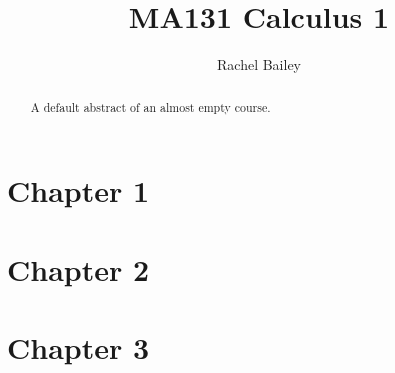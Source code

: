 \documentclass{xourse}
\title{MA131 Calculus 1}
\author{Rachel Bailey}
\begin{document}
\begin{abstract}
    A default abstract of an almost empty course.
\end{abstract}
\maketitle

\part{Chapter 1}


\part{Chapter 2}

\part{Chapter 3}
\end{document}
